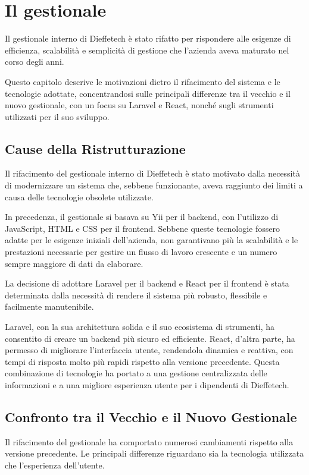 \chapter{Il gestionale}\label{chapter:gestionale}
Il gestionale interno di Dieffetech è stato rifatto per rispondere alle esigenze di efficienza, scalabilità e semplicità di gestione che l'azienda aveva maturato nel corso degli anni.

Questo capitolo descrive le motivazioni dietro il rifacimento del sistema e le tecnologie adottate, concentrandosi sulle principali differenze tra il vecchio e il nuovo gestionale, con un focus su Laravel e React, nonché sugli strumenti utilizzati per il suo sviluppo.

\section{Cause della Ristrutturazione}\label{sec:cap_sec_subsec_perchè}
Il rifacimento del gestionale interno di Dieffetech è stato motivato dalla necessità di modernizzare un sistema che, sebbene funzionante, aveva raggiunto dei limiti a causa delle tecnologie obsolete utilizzate.

In precedenza, il gestionale si basava su Yii per il backend, con l'utilizzo di JavaScript, HTML e CSS per il frontend. Sebbene queste tecnologie fossero adatte per le esigenze iniziali dell'azienda, non garantivano più la scalabilità e le prestazioni necessarie per gestire un flusso di lavoro crescente e un numero sempre maggiore di dati da elaborare.

La decisione di adottare Laravel per il backend e React per il frontend è stata determinata dalla necessità di rendere il sistema più robusto, flessibile e facilmente manutenibile.

Laravel, con la sua architettura solida e il suo ecosistema di strumenti, ha consentito di creare un backend più sicuro ed efficiente. React, d'altra parte, ha permesso di migliorare l'interfaccia utente, rendendola dinamica e reattiva, con tempi di risposta molto più rapidi rispetto alla versione precedente. Questa combinazione di tecnologie ha portato a una gestione centralizzata delle informazioni e a una migliore esperienza utente per i dipendenti di Dieffetech.

\section{Confronto tra il Vecchio e il Nuovo Gestionale}
Il rifacimento del gestionale ha comportato numerosi cambiamenti rispetto alla versione precedente. Le principali differenze riguardano sia la tecnologia utilizzata che l'esperienza dell'utente.

